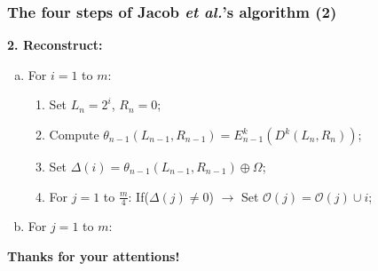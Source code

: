 \documentclass{beamer}
\begin{document}
\frame
{
\frametitle{The four steps of Jacob \textit{et al.}'s algorithm (2)}
\textbf{2. Reconstruct:}
\begin{enumerate}[(a)]
\item For $i=1$ to $m$:

\begin{enumerate}[1)]
\item Set $L_{n}=2^{i}$, $R_{n}=0$;
\item Compute $\theta_{n-1}(L_{n-1}, R_{n-1})=E^{k}_{n-1}(D^{k}(L_{n}, R_{n}))$;
\item Set $\Delta(i)=\theta_{n-1}(L_{n-1}, R_{n-1}) \oplus \Omega$;
\item For $j=1$ to $\frac{m}{4}$: If($\Delta(j) \neq 0$) $\rightarrow$ Set $\mathcal{O}(j)=\mathcal{O}(j) \cup {i}$;
\end{enumerate}

\item For $j=1$ to $m$:
\end{enumerate}
}

\frame
{
\begin{center}
\textbf{Thanks for your attentions!}
\end{center}
\begin{center}

\end{center}
}
\end{document}
